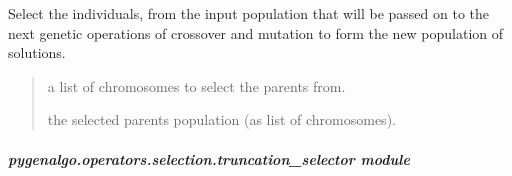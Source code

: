 \documentclass[letterpaper,10pt,english]{sphinxmanual}
\begin{document}
\begin{fulllineitems}
\begin{fulllineitems}
\label{\detokenize{pygenalgo.operators.selection:pygenalgo.operators.selection.tournament_selector.TournamentSelector.select}}
\pysigstartsignatures
\pysiglinewithargsret
{}
{}
{}
\pysigstopsignatures
\sphinxAtStartPar
Select the individuals, from the input population that will be passed on
to the next genetic operations of crossover and mutation to form the new
population of solutions.
\begin{quote}\begin{description}
\sphinxAtStartPar
{} \textendash{} a list of chromosomes to select the parents from.

\sphinxAtStartPar
the selected parents population (as list of chromosomes).

\end{description}\end{quote}

\end{fulllineitems}


\end{fulllineitems}



\subparagraph{pygenalgo.operators.selection.truncation\_selector module}
\label{\detokenize{pygenalgo.operators.selection:module-pygenalgo.operators.selection.truncation_selector}}\label{\detokenize{pygenalgo.operators.selection:pygenalgo-operators-selection-truncation-selector-module}}
\end{document}
